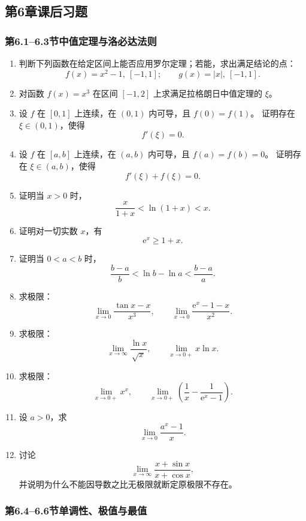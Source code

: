 \documentclass[fontset=fandol]{ctexart}
\newcommand{\ee}{\mathrm{e}}
\begin{document}
\iffalse



\subsection*{第6章课后习题}

\subsubsection*{第6.1--6.3节\quad 中值定理与洛必达法则}

\begin{enumerate}[label=\textbf{练习\arabic*.},leftmargin=2.2em]
\item 判断下列函数在给定区间上能否应用罗尔定理；若能，求出满足结论的点：
\[
f(x)=x^2-1,\ [-1,1];\qquad
g(x)=|x|,\ [-1,1].
\]
\item 对函数 $f(x)=x^3$ 在区间 $[-1,2]$ 上求满足拉格朗日中值定理的 $\xi$。
\item 设 $f$ 在 $[0,1]$ 上连续，在 $(0,1)$ 内可导，且 $f(0)=f(1)$。 证明存在 $\xi\in(0,1)$，使得
\[
f'(\xi)=0.
\]
\item 设 $f$ 在 $[a,b]$ 上连续，在 $(a,b)$ 内可导，且 $f(a)=f(b)=0$。 证明存在 $\xi\in(a,b)$，使得
\[
f'(\xi)+f(\xi)=0.
\]
\item 证明当 $x>0$ 时，
\[
\frac{x}{1+x}<\ln(1+x)<x.
\]
\item 证明对一切实数 $x$，有
\[
\ee^x\geq1+x.
\]
\item 证明当 $0<a<b$ 时，
\[
\frac{b-a}{b}<\ln b-\ln a<\frac{b-a}{a}.
\]
\item 求极限：
\[
\lim_{x\to0}\frac{\tan x-x}{x^3},\qquad
\lim_{x\to0}\frac{\ee^x-1-x}{x^2}.
\]
\item 求极限：
\[
\lim_{x\to\infty}\frac{\ln x}{\sqrt{x}},\qquad
\lim_{x\to0+}x\ln x.
\]
\item 求极限：
\[
\lim_{x\to0+}x^x,\qquad
\lim_{x\to0+}\left(\frac1x-\frac1{\ee^x-1}\right).
\]
\item 设 $a>0$，求
\[
\lim_{x\to0}\frac{a^x-1}{x}.
\]
\item 讨论
\[
\lim_{x\to\infty}\frac{x+\sin x}{x+\cos x},
\]
并说明为什么不能因导数之比无极限就断定原极限不存在。
\end{enumerate}

\subsubsection*{第6.4--6.6节\quad 单调性、极值与最值}
\end{document}
